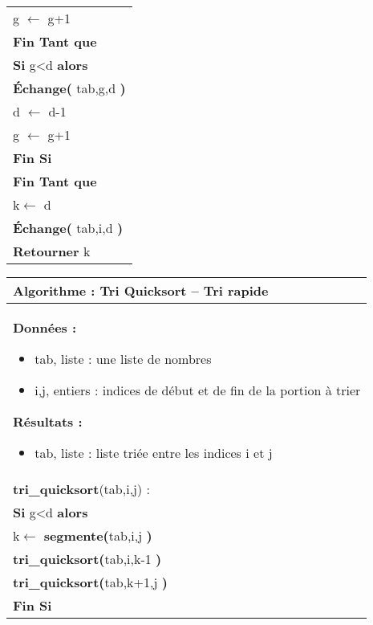\documentclass[10pt,fleqn]{article} %
\begin{document}
\begin{pseudo}
\begin{tabular}{p{}}
\hspace{1.2cm} \textsf{g $\leftarrow$ g+1}\\  
\hspace{.8cm} \textbf{Fin Tant que}  \\
\hspace{.8cm} \textbf{Si} \textsf{g<d} \textbf{alors} \\
\hspace{1.2cm} \textbf{Échange(} \textsf{tab,g,d} \textbf{)} \\
\hspace{1.2cm} \textsf{d $\leftarrow$ d-1}\\  
\hspace{1.2cm} \textsf{g $\leftarrow$ g+1}\\  
\hspace{.8cm} \textbf{Fin Si} \\
\hspace{.4cm} \textbf{Fin Tant que}  \\
\hspace{.4cm} \textsf{k$\leftarrow$ d}  \\
\hspace{.4cm} \textbf{Échange(} \textsf{tab,i,d} \textbf{)} \\
\hspace{.4cm} \textbf{Retourner} \textsf{k}  \\
\hline
\end{tabular}


\begin{tabular}{p{}}
\hline
\textbf{Algorithme :} Tri Quicksort -- Tri rapide\\
\hline
\textbf{Données :}
\begin{itemize}
\item \textsf{tab}, liste : une liste de nombres
\item \textsf{i,j}, entiers : indices de début et de fin de la portion à trier
\end{itemize}
\textbf{Résultats :} 
\begin{itemize}
\item \textsf{tab}, liste : liste triée entre les indices \textsf{i} et \textsf{j}
\end{itemize}
\\
\textbf{tri\_quicksort}(\textsf{tab,i,j}) :\\
\hspace{.4cm} \textbf{Si} \textsf{g<d} \textbf{alors} \\
\hspace{.8cm} \textsf{k$\leftarrow$} \textbf{segmente(}\textsf{tab,i,j} \textbf{)} \\
\hspace{.8cm} \textbf{tri\_quicksort(}\textsf{tab,i,k-1} \textbf{)} \\
\hspace{.8cm} \textbf{tri\_quicksort(}\textsf{tab,k+1,j} \textbf{)} \\
\hspace{.4cm} \textbf{Fin Si} \\
\hline
\end{tabular}

\end{pseudo}
\end{document}
